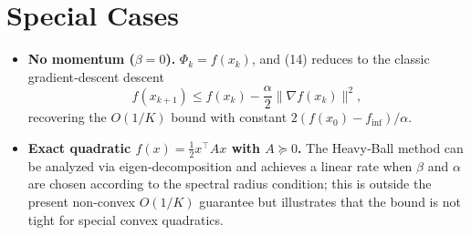 \documentclass{article}
\newcommand{\grad}{\nabla}
\begin{document}
\section*{Special Cases}
\begin{itemize}
\item \textbf{No momentum ($\beta=0$).}  
$\Phi_{k}=f(x_{k})$, and (14) reduces to the classic gradient‑descent descent
\[
f(x_{k+1})\le f(x_{k})-\frac{\alpha}{2}\|\grad f(x_{k})\|^{2},
\]
recovering the $O(1/K)$ bound with constant $2(f(x_{0})-f_{\inf})/\alpha$.
\item \textbf{Exact quadratic $f(x)=\frac{1}{2}x^{\top}Ax$ with $A\succeq0$.}  
The Heavy‑Ball method can be analyzed via eigen‑decomposition and achieves a linear rate when $\beta$ and $\alpha$ are chosen according to the spectral radius condition; this is outside the present non‑convex $O(1/K)$ guarantee but illustrates that the bound is not tight for special convex quadratics.
\end{itemize}
\end{document}
